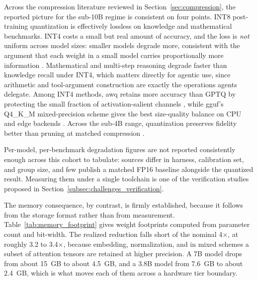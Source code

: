 Across the compression literature reviewed in Section~\ref{sec:compression}, the
reported picture for the sub-10B regime is consistent on four points. INT8
post-training quantization is effectively lossless on knowledge and mathematical
benchmarks. INT4 costs a small but real amount of accuracy, and the loss is
\emph{not} uniform across model sizes: smaller models degrade more, consistent
with the argument that each weight in a small model carries proportionally more
information \citep{slmquant2025}. Mathematical and multi-step reasoning degrade
faster than knowledge recall under INT4, which matters directly for agentic use,
since arithmetic and tool-argument construction are exactly the operations agents
delegate. Among INT4 methods, \gls{awq} retains more accuracy than GPTQ by
protecting the small fraction of activation-salient channels
\citep{lin2024awq}, while \gls{gguf}'s Q4\_K\_M mixed-precision scheme gives the
best size-quality balance on CPU and edge backends
\citep{gerganov2023llamacpp}. Across the sub-4B range, quantization preserves
fidelity better than pruning at matched compression
\citep{kurz2025pruning_vs_quant}.

Per-model, per-benchmark degradation figures are not reported consistently
enough across this cohort to tabulate: sources differ in harness, calibration
set, and group size, and few publish a matched FP16 baseline alongside the
quantized result. Measuring them under a single toolchain is one of the
verification studies proposed in
Section~\ref{subsec:challenges_verification}.

The memory consequence, by contrast, is firmly established, because it follows
from the storage format rather than from measurement.
Table~\ref{tab:memory_footprint} gives weight footprints computed from parameter
count and bit-width. The realized reduction falls short of the nominal
4$\times$, at roughly 3.2 to 3.4$\times$, because embedding, normalization, and
in mixed schemes a subset of attention tensors are retained at higher precision.
A 7B model drops from about 15~GB to about 4.5~GB, and a 3.8B model from 7.6~GB
to about 2.4~GB, which is what moves each of them across a hardware tier
boundary.


